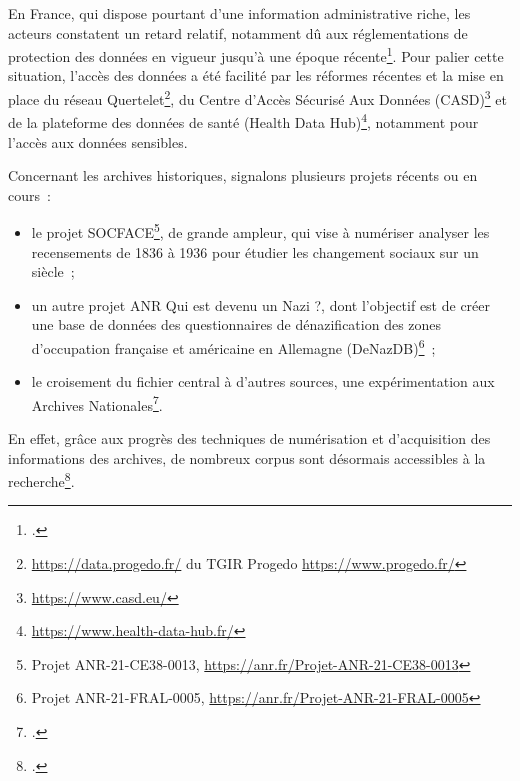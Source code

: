 \documentclass[a4paper,12pt,twoside]{book}
\begin{document}
			 En France, qui dispose pourtant d'une information administrative riche, les acteurs constatent un retard relatif, notamment dû aux réglementations de protection des données en vigueur jusqu'à une époque récente\footcite[Lois Informatique et Libertés (1978) et sur l'obligation, la coordination et le secret en matière de statistiques (1951), avant les changement de 2004, 2008 et la loi pour une république numérique (2016)~:][]{picardAccesAuxDonnees2017}.
			 Pour palier cette situation, l'accès des données a été facilité par les réformes récentes et la mise en place du réseau Quertelet\footnote{\url{https://data.progedo.fr/} du TGIR Progedo \url{https://www.progedo.fr/}}, du Centre d'Accès Sécurisé Aux Données (CASD)\footnote{\url{https://www.casd.eu/}} et de la plateforme des données de santé (\og{}Health Data Hub\fg{})\footnote{\url{https://www.health-data-hub.fr/}}, notamment pour l'accès aux données sensibles.
			 \newline
			 
			 Concernant les archives historiques, signalons plusieurs projets récents ou en cours~:
			 
			 \begin{itemize}
			 \setlength\itemsep{0.8em}
			     \item le projet SOCFACE\footnote{Projet ANR-21-CE38-0013, \url{https://anr.fr/Projet-ANR-21-CE38-0013}}, de grande ampleur, qui vise à numériser analyser les recensements de 1836 à 1936 pour étudier les changement sociaux sur un siècle~;
			     
			     \item un autre projet ANR \og{}Qui est devenu un Nazi ?\fg{}, dont l'objectif est de créer une base de données des questionnaires de dénazification des zones d'occupation française et américaine en Allemagne (DeNazDB)\footnote{Projet ANR-21-FRAL-0005, \url{https://anr.fr/Projet-ANR-21-FRAL-0005}}~;
			     
			    \item le croisement du fichier central à d'autres sources, une expérimentation aux Archives Nationales\footcite{FichierCentralArchives}.
			 \end{itemize} 
			 \pagebreak
			 
			 En effet, grâce aux progrès des techniques de numérisation et d'acquisition des informations des archives, de nombreux corpus sont désormais accessibles à la recherche\footcite[Voir aussi le projet POPP de numérisation des recensements parisiens de l'entre-deux guerre~:][]{POPPProjetOcerisation}.
			 
\end{document}
